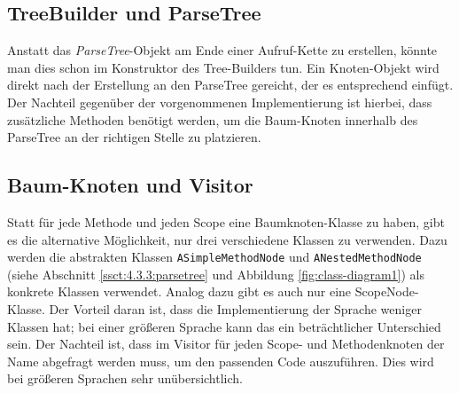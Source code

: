 \subsection{TreeBuilder und ParseTree}\label{ssct:4.4.1:alt-treebuilder-parsetree}
Anstatt das \emph{ParseTree}-Objekt am Ende einer Aufruf-Kette zu erstellen, könnte man dies schon im Konstruktor des Tree-Builders tun. Ein Knoten-Objekt wird direkt nach der Erstellung an den ParseTree gereicht, der es entsprechend einfügt. Der Nachteil gegenüber der vorgenommenen Implementierung ist hierbei, dass zusätzliche Methoden benötigt werden, um die Baum-Knoten innerhalb des ParseTree an der richtigen Stelle zu platzieren.

\subsection{Baum-Knoten und Visitor}\label{ssct:4.4.2:alt-knoten-visitor}
Statt für jede Methode und jeden Scope eine Baumknoten-Klasse zu haben, gibt es die alternative Möglichkeit, nur drei verschiedene Klassen zu verwenden. Dazu werden die abstrakten Klassen \texttt{ASimpleMethodNode} und \texttt{ANestedMethodNode} (siehe Abschnitt \ref{ssct:4.3.3:parsetree} und Abbildung \ref{fig:class-diagram1}) als konkrete Klassen verwendet. Analog dazu gibt es auch nur eine ScopeNode-Klasse. Der Vorteil daran ist, dass die Implementierung der Sprache weniger Klassen hat; bei einer größeren Sprache kann das ein beträchtlicher Unterschied sein. Der Nachteil ist, dass im Visitor für jeden Scope- und Methodenknoten der Name abgefragt werden muss, um den passenden Code auszuführen. Dies wird bei größeren Sprachen sehr unübersichtlich.